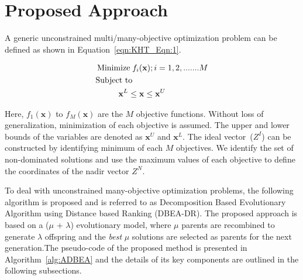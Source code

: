 \documentclass{sig-alternate}
\begin{document}
\section{Proposed Approach}
\label{sec:proapp}

\label{sec:KHT_sec:2}
A generic unconstrained multi/many-objective optimization problem can be defined as shown in Equation~\ref{eqn:KHT_Eqn:1}.

\begin{equation}
\begin{aligned}
\operatorname{Minimize}\; & f_i(\textbf{x}); i=1,2,.......M \\
\text{Subject to} & \\ 
& \hspace{-0.6cm}\textbf{x}^{L}\le\textbf{x}\le\textbf{x}^{U}\\ 
\label{eqn:KHT_Eqn:1}
\end{aligned}
\end{equation}

\noindent Here, $f_1(\textbf{x})$  to $f_M(\textbf{x})$ are the $M$ objective functions. Without loss of generalization, minimization of each objective is assumed. The upper and lower bounds of the variables are denoted as $\textbf{x}^{U}$ and $\textbf{x}^{L}$. The ideal vector~($Z^I$) can be constructed by identifying minimum of each $M$ objectives. We identify the set of non-dominated solutions and use the maximum values of each objective to define the coordinates of the nadir vector $Z^N$. 

To deal with unconstrained many-objective optimization problems, the following algorithm is proposed and is referred to as Decomposition Based Evolutionary Algorithm using Distance based Ranking (DBEA-DR). The proposed approach is based on a ($\mu$ + $\lambda$) evolutionary model, where $\mu$ parents are recombined to generate $\lambda$ offspring and the \textit{best} $\mu$ solutions are selected as parents for the next generation.The pseudo-code of the proposed method is presented in Algorithm~\ref{alg:ADBEA} and the details of its key components are outlined in the following subsections.
\end{document}
